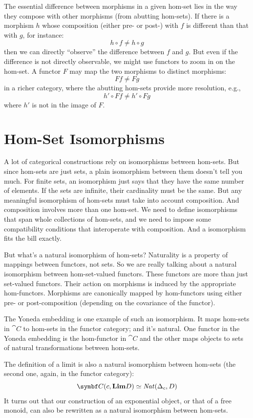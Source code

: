 The essential difference between morphisms in a given hom-set lies in
the way they compose with other morphisms (from abutting hom-sets). If
there is a morphism $h$ whose composition (either pre- or post-)
with $f$ is different than that with $g$, for instance:
\[h \circ f \neq h \circ g\]
then we can directly ``observe'' the difference between $f$ and
$g$. But even if the difference is not directly observable, we
might use functors to zoom in on the hom-set. A functor $F$ may
map the two morphisms to distinct morphisms:
\[F f \neq F g\]
in a richer category, where the abutting hom-sets provide more
resolution, e.g.,
\[h' \circ F f \neq h' \circ F g\]
where $h'$ is not in the image of $F$.

\section{Hom-Set Isomorphisms}

A lot of categorical constructions rely on isomorphisms between
hom-sets. But since hom-sets are just sets, a plain isomorphism between
them doesn't tell you much. For finite sets, an isomorphism just says
that they have the same number of elements. If the sets are infinite,
their cardinality must be the same. But any meaningful isomorphism of
hom-sets must take into account composition. And composition involves
more than one hom-set. We need to define isomorphisms that span whole
collections of hom-sets, and we need to impose some compatibility
conditions that interoperate with composition. And a 
isomorphism fits the bill exactly.

But what's a natural isomorphism of hom-sets? Naturality is a property
of mappings between functors, not sets. So we are really talking about a
natural isomorphism between hom-set-valued functors. These functors are
more than just set-valued functors. Their action on morphisms is induced
by the appropriate hom-functors. Morphisms are canonically mapped by
hom-functors using either pre- or post-composition (depending on the
covariance of the functor).

The Yoneda embedding is one example of such an isomorphism. It maps
hom-sets in $\cat{C}$ to hom-sets in the functor category; and it's
natural. One functor in the Yoneda embedding is the hom-functor in
$\cat{C}$ and the other maps objects to sets of natural transformations
between hom-sets.

The definition of a limit is also a natural isomorphism between hom-sets
(the second one, again, in the functor category):
\[\cat{C}(c, \Lim[D]) \simeq \mathit{Nat}(\Delta_c, D)\]
It turns out that our construction of an exponential object, or that of
a free monoid, can also be rewritten as a natural isomorphism between
hom-sets.

